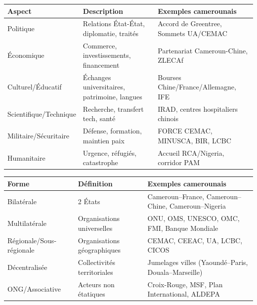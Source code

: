 \documentclass[11pt]{article}
\begin{document}
\begin{aretenir}
\begin{center}
\begin{tabularx}{\linewidth}{|l|X|X|}\hline
\textbf{Aspect} & \textbf{Description} & \textbf{Exemples camerounais} \\ \hline
Politique & Relations État-État, diplomatie, traités & Accord de Greentree, Sommets UA/CEMAC \\ \hline
Économique & Commerce, investissements, financement & Partenariat Cameroun-Chine, ZLECAf \\ \hline
Culturel/Éducatif & Échanges universitaires, patrimoine, langues & Bourses Chine/France/Allemagne, IFE \\ \hline
Scientifique/Technique & Recherche, transfert tech, santé & IRAD, centres hospitaliers chinois \\ \hline
Militaire/Sécuritaire & Défense, formation, maintien paix & FORCE CEMAC, MINUSCA, BIR, LCBC \\ \hline
Humanitaire & Urgence, réfugiés, catastrophe & Accueil RCA/Nigeria, corridor PAM \\ \hline
\end{tabularx}
\end{center}

\begin{center}
\begin{tabularx}{\linewidth}{|l|X|X|}\hline
\textbf{Forme} & \textbf{Définition} & \textbf{Exemples camerounais} \\ \hline
Bilatérale & 2 États & Cameroun–France, Cameroun–Chine, Cameroun–Nigeria \\ \hline
Multilatérale & Organisations universelles & ONU, OMS, UNESCO, OMC, FMI, Banque Mondiale \\ \hline
Régionale/Sous-régionale & Organisations géographiques & CEMAC, CEEAC, UA, LCBC, CICOS \\ \hline
Décentralisée & Collectivités territoriales & Jumelages villes (Yaoundé–Paris, Douala–Marseille) \\ \hline
ONG/Associative & Acteurs non étatiques & Croix-Rouge, MSF, Plan International, ALDEPA \\ \hline
\end{tabularx}
\end{center}
\end{aretenir}
\end{document}
